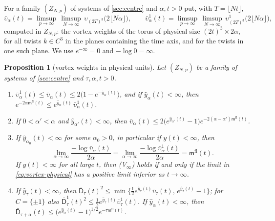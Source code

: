 \documentclass[11pt,a4paper]{amsart}
\newtheorem{proposition}[theorem]{Proposition}
\theoremstyle{definition}
\theoremstyle{remark}
\numberwithin{equation}{section}
\newcommand{\cube}[1]{(2#1)^3}             %
\begin{document}
For a family $(Z_{N,p})$ of systems of \cref{sec:centre} and $\alpha,t>0$ put, with $T=\lfloor Nt\rfloor$,
\[
\bar\upsilon_\alpha(t)=\limsup_{p\to\infty}\,\limsup_{N\to\infty}\,\upsilon_{\cube T}\bigl(2\lfloor N\alpha\rfloor\bigr),\qquad \bar\upsilon^1_\alpha(t)=\limsup_{p\to\infty}\,\limsup_{N\to\infty}\,\upsilon^1_{\cube T}\bigl(2\lfloor N\alpha\rfloor\bigr),
\]
computed in $Z_{N,p}$: the vortex weights of the torus of physical size $(2t)^3\times2\alpha$, for all twists $k\in C^3$ in the planes containing the time axis, and for the twists in one such plane. We use $e^{-\infty}=0$ and $-\log0=\infty$.

\begin{proposition}[vortex weights in physical units]\label{prop:vortex-physical}
Let $(Z_{N,p})$ be a family of systems of \cref{sec:centre} and $\tau,\alpha,t>0$.
\begin{enumerate}[label=\textup{(\alph*)},leftmargin=*]
\item $\bar\upsilon^1_\alpha(t)\le\bar\upsilon_\alpha(t)\le2\bigl(1-e^{-\hat y_\alpha(t)}\bigr)$, and if $\hat y_\alpha(t)<\infty$, then $e^{-2\alpha\mathsf m^{\mathrm{fl}}(t)}\le e^{\hat y_\alpha(t)}\,\bar\upsilon^1_\alpha(t)$.
\item If $0<\alpha'<\alpha$ and $\hat y_{\alpha'}(t)<\infty$, then $\bar\upsilon_\alpha(t)\le2\bigl(e^{\hat y_{\alpha'}(t)}-1\bigr)e^{-2(\alpha-\alpha')\mathsf m^{\mathrm{fl}}(t)}$.
\item If $\hat y_{\alpha_0}(t)<\infty$ for some $\alpha_0>0$, in particular if $y(t)<\infty$, then
\begin{equation}\label{eq:vortex-physical}
\lim_{\alpha\to\infty}\frac{-\log\bar\upsilon_\alpha(t)}{2\alpha}=\lim_{\alpha\to\infty}\frac{-\log\bar\upsilon^1_\alpha(t)}{2\alpha}=\mathsf m^{\mathrm{fl}}(t).
\end{equation}
If $y(t)<\infty$ for all large $t$, then \textup{(V$_\infty$)} holds if and only if the limit in \eqref{eq:vortex-physical} has a positive limit inferior as $t\to\infty$.
\item If $\hat y_\tau(t)<\infty$, then $\bar{\mathsf D}_\tau(t)^2\le\min\bigl\{\frac12e^{\hat y_\tau(t)}\bar\upsilon_\tau(t),\,e^{\hat y_\tau(t)}-1\bigr\}$; for $C=\{\pm1\}$ also $\bar{\mathsf D}^1_\tau(t)^2\le\frac12e^{\hat y_\tau(t)}\bar\upsilon^1_\tau(t)$. If $\hat y_\alpha(t)<\infty$, then $\bar{\mathsf D}_{\tau+\alpha}(t)\le\bigl(e^{\hat y_\alpha(t)}-1\bigr)^{1/2}e^{-\tau\mathsf m^{\mathrm{fl}}(t)}$.
\end{enumerate}
\end{proposition}
\end{document}
